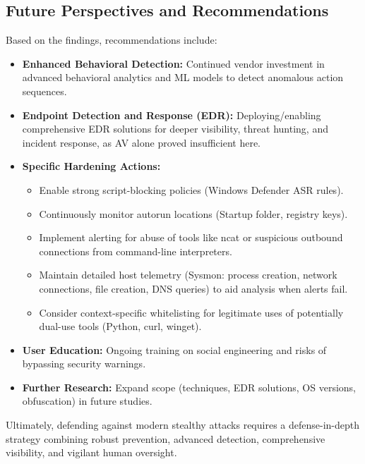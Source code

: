 \documentclass[11pt]{article}
\begin{document}
	\subsection{Future Perspectives and Recommendations}
	Based on the findings, recommendations include:
	\begin{itemize}
		\item \textbf{Enhanced Behavioral Detection:} Continued vendor investment in advanced behavioral analytics and ML models to detect anomalous action sequences.
		\item \textbf{Endpoint Detection and Response (EDR):} Deploying/enabling comprehensive EDR solutions for deeper visibility, threat hunting, and incident response, as AV alone proved insufficient here.
		\item \textbf{Specific Hardening Actions:}
		\begin{itemize}
			\item Enable strong script-blocking policies (Windows Defender ASR rules).
			\item Continuously monitor autorun locations (Startup folder, registry keys).
			\item Implement alerting for abuse of tools like ncat or suspicious outbound connections from command-line interpreters.
			\item Maintain detailed host telemetry (Sysmon: process creation, network connections, file creation, DNS queries) to aid analysis when alerts fail.
			\item Consider context-specific whitelisting for legitimate uses of potentially dual-use tools (Python, curl, winget).
		\end{itemize}
		\item \textbf{User Education:} Ongoing training on social engineering and risks of bypassing security warnings.
		\item \textbf{Further Research:} Expand scope (techniques, EDR solutions, OS versions, obfuscation) in future studies.
	\end{itemize}
	Ultimately, defending against modern stealthy attacks requires a defense-in-depth strategy combining robust prevention, advanced detection, comprehensive visibility, and vigilant human oversight.
	
\end{document}
